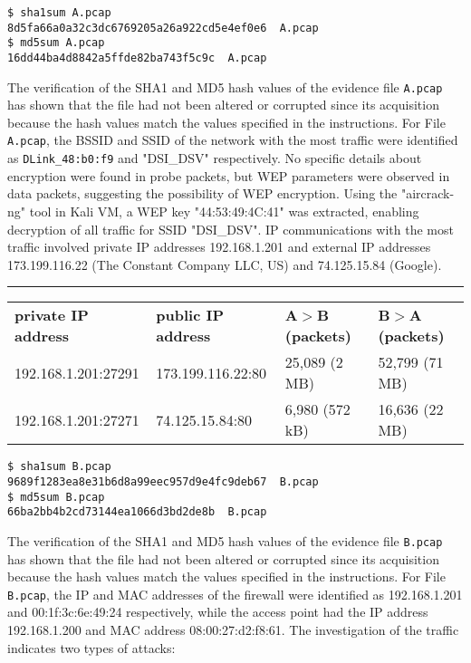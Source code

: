 \begin{verbatim}
$ sha1sum A.pcap             
8d5fa66a0a32c3dc6769205a26a922cd5e4ef0e6  A.pcap
$ md5sum A.pcap 
16dd44ba4d8842a5ffde82ba743f5c9c  A.pcap
\end{verbatim}
The verification of the SHA1 and MD5 hash values of the evidence file \texttt{A.pcap} has shown that the file had not been altered or corrupted since its acquisition because the hash values match the values specified in the instructions. For File \texttt{A.pcap}, the BSSID and SSID of the network with the most traffic were identified as \texttt{DLink\_48:b0:f9} and "DSI\_DSV" respectively. No specific details about encryption were found in probe packets, but WEP parameters were observed in data packets, suggesting the possibility of WEP encryption. Using the "aircrack-ng" tool in Kali VM, a WEP key "44:53:49:4C:41" was extracted, enabling decryption of all traffic for SSID "DSI\_DSV". IP communications with the most traffic involved private IP addresses 192.168.1.201 and external IP addresses 173.199.116.22 (The Constant Company LLC, US) and 74.125.15.84 (Google).

\noindent\rule{\textwidth}{1pt}
\vspace{-0.8cm}
\begin{table}[h]
\begin{tabular}{llll}
\textbf{private IP address} & \textbf{public IP address} & \textbf{A$>$B (packets)} & \textbf{B$>$A (packets)}\\
192.168.1.201:27291      & 173.199.116.22:80 & 25,089 (2 MB) & 52,799 (71 MB)\\
192.168.1.201:27271      & 74.125.15.84:80 & 6,980 (572 kB) & 16,636 (22 MB)
\end{tabular}
\end{table}

\begin{verbatim}
$ sha1sum B.pcap             
9689f1283ea8e31b6d8a99eec957d9e4fc9deb67  B.pcap
$ md5sum B.pcap 
66ba2bb4b2cd73144ea1066d3bd2de8b  B.pcap
\end{verbatim}
The verification of the SHA1 and MD5 hash values of the evidence file \texttt{B.pcap} has shown that the file had not been altered or corrupted since its acquisition because the hash values match the values specified in the instructions. For File \texttt{B.pcap}, the IP and MAC addresses of the firewall were identified as 192.168.1.201 and 00:1f:3c:6e:49:24 respectively, while the access point had the IP address 192.168.1.200 and MAC address 08:00:27:d2:f8:61. 
The investigation of the traffic indicates two types of attacks: 

